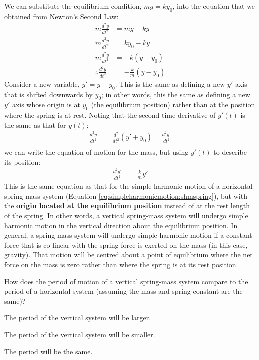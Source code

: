 We can substitute the equilibrium condition, $mg = ky_0$, into the equation that we obtained from Newton's Second Law:
\begin{align*}
 m \frac{d^2y}{dt^2}& = mg - ky \\
m \frac{d^2y}{dt^2}&= ky_0 - ky\\
m \frac{d^2y}{dt^2}&=-k(y-y_0) \\
\therefore \frac{d^2y}{dt^2} &= -\frac{k}{m}(y-y_0)
\end{align*}
Consider a new variable, $y'=y-y_0$. This is the same as defining a new $y'$ axis that is shifted downwards by $y_0$; in other words, this the same as defining a new $y'$ axis whose origin is at $y_0$ (the equilibrium position) rather than at the position where the spring is at rest. Noting that the second time derivative of $y'(t)$ is the same as that for $y(t)$:
\begin{align*}
\frac{d^2y}{dt^2} &= \frac{d^2}{dt^2} (y' + y_0) = \frac{d^2y'}{dt^2}\\
\end{align*}
we can write the equation of motion for the mass, but using $y'(t)$ to describe its position:
\begin{align*}
\frac{d^2y'}{dt^2} &= \frac{k}{m}y'
\end{align*}
This is the same equation as that for the simple harmonic motion of a horizontal spring-mass system (Equation \ref{eq:simpleharmonicmotion:shmspring}), but with the \textbf{origin located at the equilibrium position} instead of at the rest length of the spring. In other words, a vertical spring-mass system will undergo simple harmonic motion in the vertical direction about the equilibrium position. In general, a spring-mass system will undergo simple harmonic motion if a constant force that is co-linear with the spring force is exerted on the mass (in this case, gravity). That motion will be centred about a point of equilibrium where the net force on the mass is zero rather than where the spring is at its rest position.

\begin{checkpoint}
\begin{MCquestion}
{How does the period of motion of a vertical spring-mass system compare to the period of a horizontal system (assuming the mass and spring constant are the same)?}
\item The period of the vertical system will be larger. 
\item The period of the vertical system will be smaller.
\item The period will be the same. \correct 
\end{MCquestion}
\end{checkpoint}

